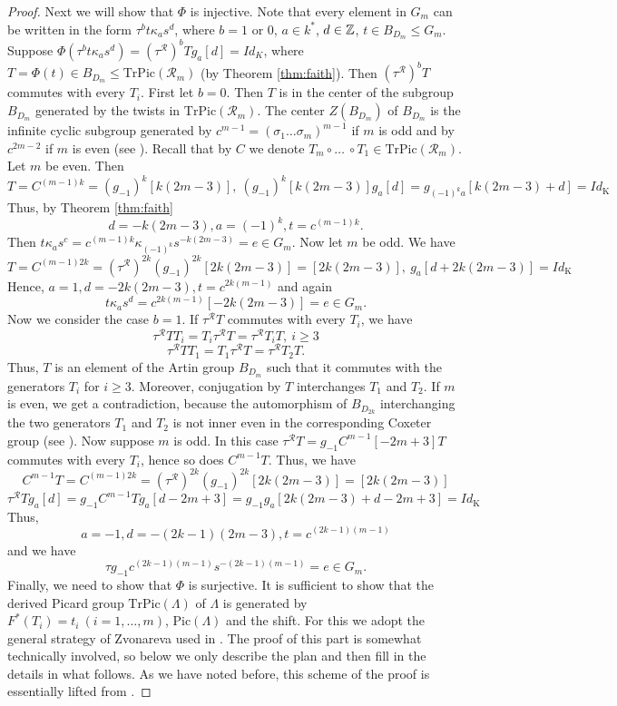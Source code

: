 \documentclass[12pt]{amsart}
\theoremstyle{plain}
\theoremstyle{remark}
\theoremstyle{definition}
\newcommand{\Pic}{{\mathrm{Pic}}}
\newcommand{\TrPic}{{\mathrm{TrPic}}}
\newcommand{\K}{{\mathrm{K}}}
\begin{document}
\begin{proof}
Next we will show that $\Phi$ is injective. Note that every element in $G_m$ can be written in the form $\tau^b t \kappa_a s^d $, where $b = 1$ or $0$, $a \in k^*$, $d \in \mathbb Z$, $t \in B_{D_m}\leqslant G_m$. Suppose ${\Phi(\tau^b t \kappa_a s^d) = (\tau^{\mathcal{R}})^bT g_a [d] = Id_{K}}$, where $T = \Phi(t) \in B_{D_m} \leqslant \TrPic(\mathcal{R}_m)$ (by Theorem \ref{thm:faith}). Then  $(\tau^{\mathcal{R}})^bT$ commutes with every $T_i$. First let $b=0$. Then $T$ is in the center of the subgroup $B_{D_m}$ generated by the twists in $\TrPic(\mathcal{R}_m)$. The center $Z(B_{D_m})$ of $B_{D_m}$ is the infinite cyclic subgroup generated by $c^{m-1} = (\sigma_1 \dots \sigma_m)^{m-1}$ if $m$ is odd and by $c^{2m-2}$ if $m$ is even (see \cite{BS}). Recall that by $C$ we denote $T_m \circ \dots\ \circ T_1 \in \TrPic(\mathcal{R}_m)$. Let $m$ be even. Then 
$$ T = C^{(m-1)k} = (g_{-1})^k[k(2m-3)], \  (g_{-1})^k[k(2m-3)]g_a [d] = g_{(-1)^ka}[k(2m-3)+d] = Id_{\K}  $$
Thus, by  Theorem \ref{thm:faith} 
$$d=-k(2m-3), a = (-1)^k, t = c^{(m-1)k}.$$
Then $t \kappa_a s^c = c^{(m-1)k} \kappa_{(-1)^k}s^{-k(2m-3)} = e \in G_m$. Now let $m$ be odd. We have 
$$ T = C^{(m-1)2k} = (\tau^{\mathcal{R}})^{2k}(g_{-1})^{2k}[2k(2m-3)] = [2k(2m-3)], \ g_a [d+2k(2m-3)] = Id_{\K} $$
Hence, $a=1, d= -2k(2m-3), t = c^{2k(m-1)}$ and again $${t \kappa_a s^d = c^{2k(m-1)}[-2k(2m-3)] = e \in G_m}.$$ Now we consider the case $b=1$. If $\tau^{\mathcal{R}}T$ commutes with every $T_i$, we have 
$$ \tau^{\mathcal{R}} T T_i =  T_i\tau^{\mathcal{R}} T = \tau^{\mathcal{R}} T_i T, \ i \geq 3  $$
$$ \tau^{\mathcal{R}} T T_1 =  T_1\tau^{\mathcal{R}} T = \tau^{\mathcal{R}} T_2 T. $$
Thus, $T$ is an element of the Artin group $B_{D_m}$ such that it commutes with the generators $T_i$ for $i \geq 3$. Moreover, conjugation by $T$ interchanges $T_1$ and $T_2$. If $m$ is even, we get a contradiction, because the automorphism of $B_{D_{2k}}$ interchanging the two generators $T_1$ and $T_2$ is not inner even in the corresponding Coxeter group (see \cite{F}). Now suppose $m$ is odd. In this case $\tau^{\mathcal{R}}T = g_{-1}C^{m-1}[-2m+3]T$ commutes with every $T_i$, hence so does $C^{m-1}T$. Thus, we have $$C^{m-1}T = C^{(m-1)2k} = (\tau^{\mathcal{R}})^{2k}(g_{-1})^{2k}[2k(2m-3)] = [2k(2m-3)]$$
$$ \tau^{\mathcal{R}} T g_a [d] =  g_{-1}C^{m-1}T g_a [d-2m+3] =  g_{-1}g_{a}[2k(2m-3)+d-2m+3] = Id_{\K}$$
Thus, $$a=-1, d=-(2k-1)(2m-3), t = c^{(2k-1)(m-1)}$$ and we have $${\tau g_{-1} c^{(2k-1)(m-1)} s^{-(2k-1)(m-1)} = e \in G_m.}$$ 
 Finally, we need to show that $\Phi$ is surjective. It is sufficient to show that the derived Picard group $\TrPic(\Lambda)$ of $\Lambda$ is generated by $F^*(T_i)=t_i \ (i=1,\dots,m)$, $\Pic(\Lambda)$ and the shift. For this we adopt the general strategy of Zvonareva used in \cite{Alexandra}. The proof of this part is somewhat technically involved, so below we only describe the plan and then fill in the details in what follows. As we have noted before, this scheme of the proof is essentially lifted from \cite{Alexandra}. 

\end{proof}
\end{document}
